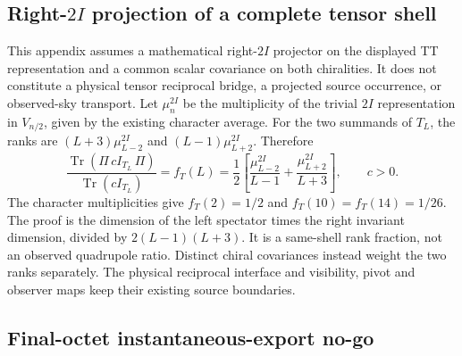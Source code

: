 \documentclass[12pt,a4paper]{article}
\begin{document}
\subsection{Right-$2I$ projection of a complete tensor shell}
\label{p8:app:tensor-2i-rank}
This appendix assumes a mathematical right-$2I$ projector on the displayed
TT representation and a common scalar covariance on both chiralities.
It does not constitute a physical tensor reciprocal bridge, a projected
source occurrence, or observed-sky transport. Let $\mu_n^{2I}$ be the
multiplicity of the trivial $2I$ representation in $V_{n/2}$, given by
the existing character average. For the two summands of $T_L$, the ranks
are $(L+3)\mu_{L-2}^{2I}$ and $(L-1)\mu_{L+2}^{2I}$. Therefore
\[
 \frac{\operatorname{Tr}(\Pi\,cI_{T_L}\,\Pi)}
      {\operatorname{Tr}(cI_{T_L})}
 =f_T(L)=\frac12\left[
      \frac{\mu_{L-2}^{2I}}{L-1}
                  +\frac{\mu_{L+2}^{2I}}{L+3}\right],\qquad c>0.
\]
The character multiplicities give
$f_T(2)=1/2$ and $f_T(10)=f_T(14)=1/26$.
The proof is the dimension of the left spectator times the right invariant
dimension, divided by $2(L-1)(L+3)$. It is a same-shell rank fraction,
not an observed quadrupole ratio. Distinct chiral covariances instead
weight the two ranks separately. The physical reciprocal interface and
visibility, pivot and observer maps keep their existing source boundaries.




\subsection{Final-octet instantaneous-export no-go}
\label{p8:app:k48-instantaneous-export-no-go}
\end{document}

